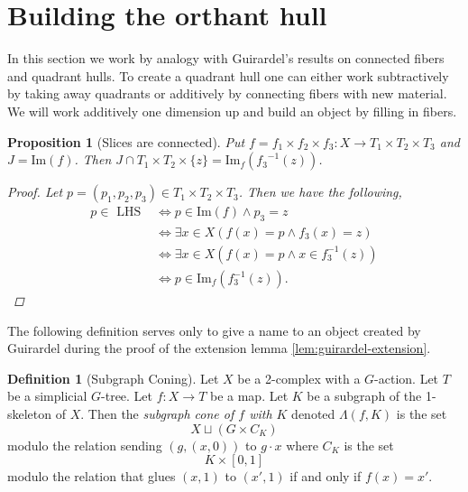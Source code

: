 \documentclass[12pt,parskip=full]{report}
\theoremstyle{plain}
\newtheorem{prop}[thm]{Proposition}
\theoremstyle{definition}
\newtheorem{dfn}[thm]{Definition}
\begin{document}


\section{Building the orthant hull}

In this section we work by analogy with Guirardel's results on connected fibers and quadrant hulls. To create a quadrant hull one can either work subtractively by taking away quadrants or additively by connecting fibers with new material. We will work additively one dimension up and build  an object by filling in fibers.


\begin{prop}
    [Slices are connected]
 \label{prop:fibershomeoplanes} 
    Put \(f =  f_{1} \times f_{2} \times f_{3}: X \to T_{1} \times T_{2} \times T_{3} \) and \(J = \text{Im}(f)\). Then \(J \cap T_{1} \times T_{2} \times \{z\} = \text{Im}_{f} ({ f_{3}}^{-1}(z))\). 
    

    \begin{proof}
            Let \(p = (p_{1}, p_{2} , p_{3}) \in T_{1} \times T_{2} \times T_{3}\). Then we have the following, 
    \begin{align*}
        p \in \text { LHS } & \Longleftrightarrow p \in \text{Im}(f) \wedge p_{3} = z \\ 
        & \Longleftrightarrow \exists x \in X (f(x)=p \wedge  f_3(x)=z)\\
        & \Longleftrightarrow \exists x \in X (f(x)=p \wedge x \in f_3^{-1} (z))\\
        & \Longleftrightarrow p \in \text{Im}_f(f_3^{-1} (z)).
    \end{align*}
    \end{proof}
\end{prop}

The following definition serves only to give a name to an object created by Guirardel during the proof of the extension lemma \ref{lem:guirardel-extension}.
\begin{dfn}
    [Subgraph Coning]
    \label{dfn:subgraphconing}
    Let \(X\) be a 2-complex with a \(G\)-action. Let \(T\) be a simplicial \(G\)-tree. Let \(f:X\to T\) be a map. Let \(K\) be a subgraph of the 1-skeleton of \(X\). Then the \emph{subgraph cone of \(f\) with \(K\)} denoted \(\Lambda(f, K)\) is the set \[X \sqcup \left(G\times C_K\right)\] modulo the relation sending \((g, (x,0))\) to \(g\cdot x\) where \(C_K\) is the set \[ K\times [0,1]\] modulo the relation that glues \((x,1)\) to \((x', 1)\) if and only if \(f(x) = x'\). 
\end{dfn}
\end{document}
